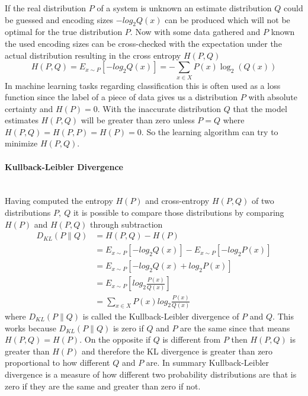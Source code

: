 If the real distribution $P$ of a system is unknown an estimate distribution $Q$ could be guessed
and encoding sizes $-log_{2}Q(x)$ can be produced which will not be optimal for the true distribution
$P$. Now with some data gathered and $P$ known the used encoding sizes can be cross-checked with the
expectation under the actual distribution resulting in the cross entropy $H(P,Q)$
\begin{equation}
    H(P,Q)=E_{x\sim P}[-log_{2}Q(x)]=-\sum_{x\in X} P(x)\log_{2} (Q(x))
\end{equation}
In machine learning tasks regarding classification this is often used as a loss function since the
label of a piece of data gives us a distribution $P$ with absolute certainty and $H(P)=0$. With the
inaccurate distribution $Q$ that the model estimates $H(P,Q)$ will be greater than zero unless
$P=Q$ where $H(P,Q)=H(P,P)=H(P)=0$. So the learning algorithm can try to minimize $H(P,Q)$.

\paragraph{Kullback-Leibler Divergence}\mbox{}\\

Having computed the entropy $H(P)$ and cross-entropy $H(P,Q)$ of two distributions $P,\ Q$ it is 
possible to compare those distributions by comparing $H(P)$ and $H(P,Q)$ through subtraction
\begin{equation} \label{eq1}
    \begin{split}
        D_{KL}(P\parallel Q)    & = H(P,Q)-H(P) \\
                                & = E_{x\sim P}[-log_{2}Q(x)]-E_{x\sim P}[-log_{2}P(x)]\\
                                & = E_{x\sim P}[-log_{2}Q(x)+log_{2}P(x)]\\
                                & = E_{x\sim P}[log_{2}\frac{P(x)}{Q(x)}]\\
                                & = \sum_{x\in X} P(x)log_{2}\frac{P(x)}{Q(x)}
    \end{split}
\end{equation}
where $D_{KL}(P\parallel Q)$ is called the Kullback-Leibler divergence of $P$ and $Q$. This works
because $D_{KL}(P\parallel Q)$ is zero if $Q$ and $P$ are the same since that means $H(P,Q)=H(P)$.
On the opposite if $Q$ is different from $P$ then $H(P,Q)$ is greater than $H(P)$ and therefore 
the KL divergence is greater than zero proportional to how different $Q$ and $P$ are.
In summary Kullback-Leibler divergence is a measure of how different two probability distributions
are that is zero if they are the same and greater than zero if not.

